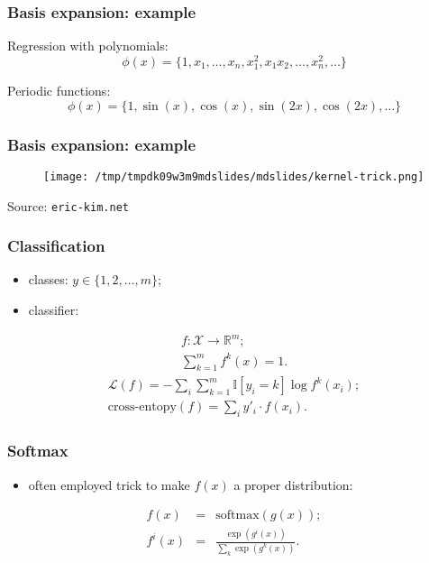 \documentclass[mathserif, aspectratio=43]{beamer}
\begin{document}
\begin{frame}[fragile]
\frametitle{Basis expansion: example}
Regression with polynomials:
$$\phi(x) = \{1, x_1, \dots, x_n, x^2_1, x_1 x_2, \dots, x^2_n, \dots\}$$

Periodic functions:
$$\phi(x) = \{1, \sin(x), \cos(x), \sin(2x), \cos(2x), \dots\}$$


\end{frame}


\begin{frame}[fragile]
\frametitle{Basis expansion: example}
\begin{figure}
\centering
\texttt{[image: /tmp/tmpdk09w3m9mdslides/mdslides/kernel-trick.png]}

\end{figure}

{
  \footnotesize
  Source: \texttt{eric-kim.net}
}

\end{frame}


\begin{frame}[fragile]
\frametitle{Classification}
\begin{itemize}
\item classes: $y \in \{1, 2, \dots, m\}$;
\item classifier:
\end{itemize}
\begin{eqnarray*}
  f: \mathcal{X} \to \mathbb{R}^m;\\
  \sum^m_{k=1} f^k(x) = 1.
\end{eqnarray*}
\begin{eqnarray*}
  \mathcal{L}(f) = -\sum_i \sum^m_{k = 1} \mathbb{I}[y_i = k]\log f^k(x_i);\\
  \mathrm{cross\text{-}entopy}(f) = \sum_i y'_i \cdot f(x_i).
\end{eqnarray*}

\end{frame}


\begin{frame}[fragile]
\frametitle{Softmax}
\begin{itemize}
\item often employed trick to make $f(x)$ a proper distribution:
\end{itemize}
\begin{eqnarray*}
f(x) &=& \mathrm{softmax}(g(x));\\[5mm]
f^i(x) &=& \frac{\exp(g^i(x))}{\sum_k \exp(g^k(x))}.
\end{eqnarray*}

\end{frame}
\end{document}
